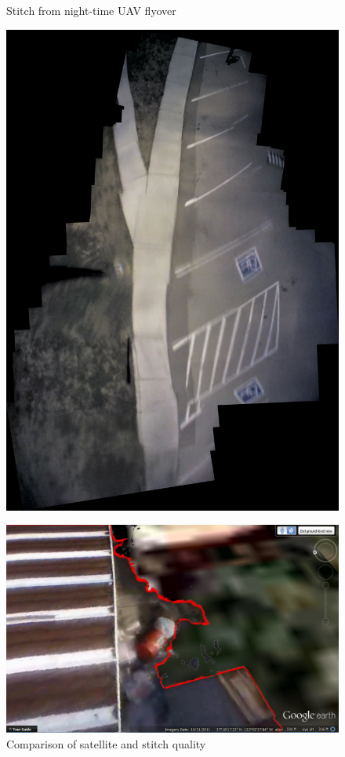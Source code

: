 \begin{figure}[h]
	\begin{minipage}{.5\textwidth}
		\caption{Stitch from night-time UAV flyover}
		\label{fig:KennedySidewalk}
		\centering
			\includegraphics[width=0.95\linewidth]{illustrations/maps/KennedySidewalkStitch}
	\end{minipage}
	\begin{minipage}{.5\textwidth}
		\caption{Comparison of satellite and stitch quality}
		\label{fig:DebrisEarth}
		\centering
			\includegraphics[width=0.95\linewidth]{illustrations/maps/debris}

\end{minipage}
\end{figure}
